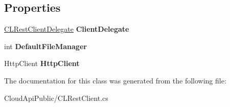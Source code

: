 \subsection*{Properties}
\begin{DoxyCompactItemize}
\item 
\hypertarget{class_cloud_api_public_1_1_c_l_rest_client_a8d55bf3b9d6b7c094c85c16081fc2163}{\hyperlink{interface_cloud_api_public_1_1_c_l_rest_client_delegate}{C\-L\-Rest\-Client\-Delegate} {\bfseries Client\-Delegate}}\label{class_cloud_api_public_1_1_c_l_rest_client_a8d55bf3b9d6b7c094c85c16081fc2163}

\item 
\hypertarget{class_cloud_api_public_1_1_c_l_rest_client_a822b5ce30bd3c0eca7ca2492dcbe8126}{int {\bfseries Default\-File\-Manager}}\label{class_cloud_api_public_1_1_c_l_rest_client_a822b5ce30bd3c0eca7ca2492dcbe8126}

\item 
\hypertarget{class_cloud_api_public_1_1_c_l_rest_client_a1b45c66f9ebe956882466d25a7de1308}{Http\-Client {\bfseries Http\-Client}}\label{class_cloud_api_public_1_1_c_l_rest_client_a1b45c66f9ebe956882466d25a7de1308}

\end{DoxyCompactItemize}


The documentation for this class was generated from the following file\-:\begin{DoxyCompactItemize}
\item 
Cloud\-Api\-Public/C\-L\-Rest\-Client.\-cs\end{DoxyCompactItemize}
